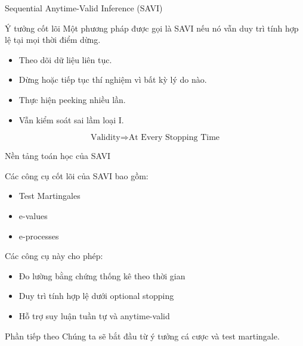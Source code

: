 \begin{frame}{Sequential Anytime-Valid Inference (SAVI)}

\begin{block}{Ý tưởng cốt lõi}
Một phương pháp được gọi là SAVI nếu nó vẫn duy trì tính hợp lệ tại mọi thời điểm dừng.
\end{block}

\begin{itemize}

\item Theo dõi dữ liệu liên tục.

\item Dừng hoặc tiếp tục thí nghiệm vì bất kỳ lý do nào.

\item Thực hiện peeking nhiều lần.

\item Vẫn kiểm soát sai lầm loại I.

\end{itemize}

\[
\text{Validity}
\Longrightarrow
\text{At Every Stopping Time}
\]

\end{frame}

\begin{frame}{Nền tảng toán học của SAVI}

Các công cụ cốt lõi của SAVI bao gồm:

\begin{itemize}

\item Test Martingales

\item e-values

\item e-processes

\end{itemize}

\vspace{0.3cm}

Các công cụ này cho phép:

\begin{itemize}

\item Đo lường bằng chứng thống kê theo thời gian

\item Duy trì tính hợp lệ dưới optional stopping

\item Hỗ trợ suy luận tuần tự và anytime-valid

\end{itemize}

\begin{block}{Phần tiếp theo}
Chúng ta sẽ bắt đầu từ ý tưởng cá cược và test martingale.
\end{block}

\end{frame}


